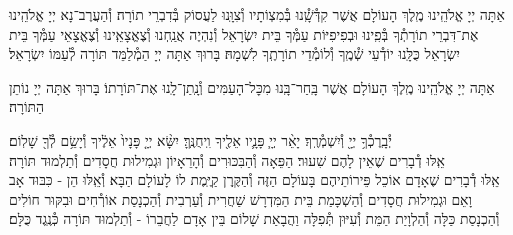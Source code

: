 \documentclass[twoside, openany, parskip=half, 11pt]{book}
\begin{document}
אַתָּה יְיָ אֱלֹהֵֽינוּ מֶֽלֶךְ הָעוֹלָם אֲשֶׁר קִדְּ֯שָֽׁ֯נוּ בְּ֯מִצְוֹתָיו וְ֯צִוָּֽנוּ לַעֲסוֹק בְּ֯דִבְרֵי תוֹרָה׃ וְ֯הַעֲרֶב־נָא יְיָ אֱלֹהֵֽינוּ אֶת־דִּבְרֵי תוֹרָתְ֯ךָ בְּ֯פִֽינוּ וּבְפִיפִיּוֹת עַמְּ֯ךָ בֵּית יִשְׂרָאֵל וְ֯נִהְיֶה אֲנַֽחְנוּ וְ֯צֶאֱצָאֵֽינוּ וְ֯צֶאֱצָאֵי עַמְּ֯ךָ בֵּית יִשְׂרָאֵל כֻּלָּֽנוּ יוֹדְ֯עֵי שְׁ֯מֶֽךָ וְ֯לוֹמְ֯דֵי תוֹרָתֶֽךָ לִשְׁמָהּ׃ בָּרוּךְ אַתָּה יְיָ הַמְ֯לַמֵּד תּוֹרָה לְ֯עַמּוֹ יִשְׂרָאֵל׃

אַתָּה יְיָ אֱלֹהֵֽינוּ מֶֽלֶךְ הָעוֹלָם אֲשֶׁר בָּֽחַר־בָּֽנוּ מִכׇּל־הָעַמִּים וְ֯נָֽתַן־לָֽנוּ אֶת־תּוֹרָתוֹ׃ בָּרוּךְ אַתָּה יְיָ נוֹתֵן הַתּוֹרָה׃



יְ֯בָֽרֶכְ֯ךָ֥ יְיָ֖ וְ֯יִשְׁמְ֯רֶֽךָ׃ יָאֵ֨ר יְיָ֧ פָּנָ֛יו אֵלֶ֖יךָ וִֽיחֻנֶּֽךָּ׃ יִשָּׂ֨א יְיָ֤ פָּנָיו֙ אֵלֶ֔יךָ וְ֯יָשֵׂ֥ם לְ֯ךָ֖ שָׁלֽוֹם׃\\
אֵֽלּוּ דְ֯בָרִים שֶׁאֵין לָהֶם שִׁעוּר׃ הַפֵּאָה וְ֯הַבִּכּוּרִים וְ֯הָרֵאָיוֹן וּגְמִילוּת חֲסָדִים וְ֯תַלְמוּד תּוֹרָה׃\\
אֵֽלּוּ דְ֯בָרִים שֶׁאָדָם אוֹכֵל פֵּירוֹתֵיהֶם בָּעוֹלָם הַזֶּה וְ֯הַקֶּֽרֶן קַיֶּֽמֶת לוֹ לָעוֹלָם הַבָּא׃ וְ֯אֵֽלּוּ הֵן - כִּבּוּד אָב וָאֵם וּגְמִילוּת חֲסָדִים וְ֯הַשְׁכָּמַת בֵּית הַמִּדְרָשׁ שַׁחֲרִית וְ֯עַרְבִית וְ֯הַכְנָסַת אוֹרְ֯חִים וּבִקּוּר חוֹלִים וְ֯הַכְנָסַת כַּלָּה וְ֯הַלְוָיַת הַמֵּת וְ֯עִיּוּן תְּ֯פִלָּה וַהֲבָאַת שָׁלוֹם בֵּין אָדָם לַחֲבֵרוֹ - וְ֯תַלְמוּד תּוֹרָה כְּ֯נֶֽגֶד כֻּלָּם׃




\newcommand{\adonolam}{

\firstword{אֲדוֹן עוֹלָם}
אֲשֶׁר מָלַךְ \hfill בְּ֯טֶֽרֶם כׇּל־יְ֯צִיר נִבְרָא׃ \\
לְ֯עֵת נַעֲשָׂה בְ֯חֶפְצוֹ כֹּל \hfill אֲזַי מֶֽלֶךְ שְׁ֯מוֹ נִקְרָא׃\\
וְ֯אַֽחֲרֵי כִּכְלוֹת הַכֹּל \hfill לְ֯בַדּוֹ יִמְלֹךְ נוֹרָא׃ \\
וְ֯הוּא הָיָה וְ֯הוּא הוֶֹה \hfill וְ֯הוּא יִהְיֶה בְּ֯תִפְאָרָה׃ \\
וְ֯הוּא אֶחָד וְ֯אֵין שֵׁנִי \hfill לְ֯הַמְשִׁיל לוֹ לְ֯הַחְבִּֽירָה׃ \\
בְּ֯לִי רֵאשִׁית בְּ֯לִי תַכְלִית \hfill וְ֯לוֹ הָעֹז וְ֯הַמִּשְׂרָה׃ \\
וְ֯הוּא אֵלִי וְ֯חַי גוֹאֲלִי \hfill וְ֯צוּר חֶבְלִי בְּ֯עֵת צָרָה׃ \\
וְ֯הוּא נִסִּי וּמָנוֹסִי \hfill מְ֯נָת כּוֹסִי בְּ֯יוֹם אֶקְרָא׃ \\
בְּ֯יָדוֹ אַפְקִיד רוּחִי \hfill בְּ֯עֵת אִישַׁן וְ֯אָעִֽירָה׃ \\
וְ֯עִם רוּחִי גְּ֯וִיָּתִי \hfill אֲדוֹנָי לִי וְ֯לֹא אִירָא׃
}
\end{document}

